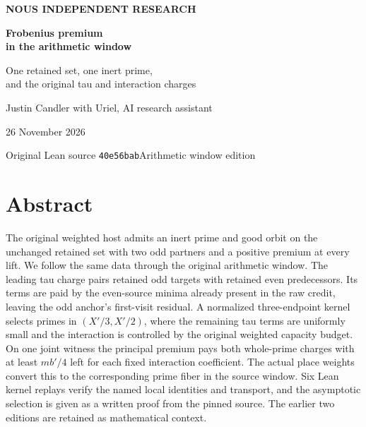 \documentclass[12pt,letterpaper]{article}
\begin{document}
\thispagestyle{empty}
\begin{center}
\vspace*{.50in}
{\sffamily\small\bfseries\color{accent}NOUS INDEPENDENT RESEARCH}\par\vspace{.62in}
{\fontsize{31}{37}\selectfont\bfseries\color{ink}Frobenius premium\\in the arithmetic window}\par\vspace{.25in}
{\Large One retained set, one inert prime,\\and the original tau and interaction charges}\par\vspace{.34in}
\par\vspace{.46in}
{\large Justin Candler with Uriel, AI research assistant}\par
26 November 2026
\end{center}
\vfill
\begin{center}\small\sffamily
Original Lean source \texttt{40e56bab}\quad\textbar\quad Arithmetic window edition
\end{center}
\clearpage
\section*{Abstract}
The original weighted host admits an inert prime and good orbit on the unchanged retained set with two odd partners and a positive premium at every lift. We follow the same data through the original arithmetic window. The leading tau charge pairs retained odd targets with retained even predecessors. Its terms are paid by the even-source minima already present in the raw credit, leaving the odd anchor's first-visit residual. A normalized three-endpoint kernel selects primes in \((X'/3,X'/2)\), where the remaining tau terms are uniformly small and the interaction is controlled by the original weighted capacity budget. On one joint witness the principal premium pays both whole-prime charges with at least \(mb'/4\) left for each fixed interaction coefficient. The actual place weights convert this to the corresponding prime fiber in the source window. Six Lean kernel replays verify the named local identities and transport, and the asymptotic selection is given as a written proof from the pinned source. The earlier two editions are retained as mathematical context.
\end{document}
